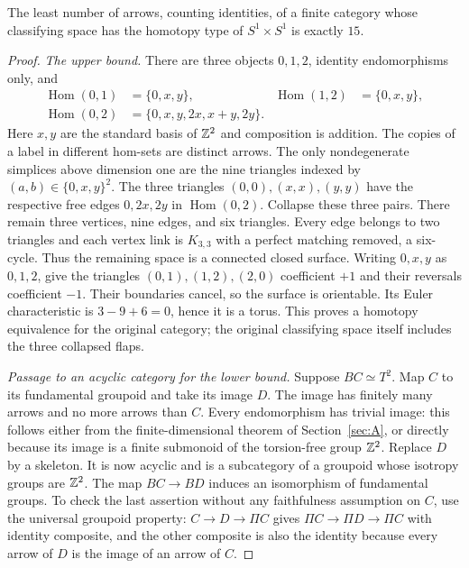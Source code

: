 \begin{theorem}\label{thm:C-torus15}
The least number of arrows, counting identities, of a finite category
whose classifying space has the homotopy type of $S^1\times S^1$
is exactly $15$.
\end{theorem}
\begin{proof}
\emph{The upper bound.}
There are three objects $0,1,2$, identity endomorphisms only, and
\[
\begin{aligned}
 \operatorname{Hom}(0,1)&=\{0,x,y\},&
 \operatorname{Hom}(1,2)&=\{0,x,y\},\\
 \operatorname{Hom}(0,2)&=\{0,x,y,2x,x+y,2y\}.&&
\end{aligned}
\]
Here $x,y$ are the standard basis of $\mathbb Z^2$ and composition is addition.
The copies of a label in different hom-sets are distinct arrows.
The only nondegenerate simplices above dimension one are the nine
triangles indexed by $(a,b)\in\{0,x,y\}^2$.
The three triangles $(0,0),(x,x),(y,y)$ have the respective free edges
$0,2x,2y$ in $\operatorname{Hom}(0,2)$. Collapse these three pairs.
There remain three vertices, nine edges, and six triangles.
Every edge belongs to two triangles and each vertex link is
$K_{3,3}$ with a perfect matching removed, a six-cycle.
Thus the remaining space is a connected closed surface.
Writing $0,x,y$ as $0,1,2$, give the triangles $(0,1),(1,2),(2,0)$
coefficient $+1$ and their reversals coefficient $-1$.
Their boundaries cancel, so the surface is orientable. Its Euler
characteristic is $3-9+6=0$, hence it is a torus.
This proves a homotopy equivalence for the original category; the
original classifying space itself includes the three collapsed flaps.

\emph{Passage to an acyclic category for the lower bound.}
Suppose $BC\simeq T^2$. Map $C$ to its fundamental groupoid and
take its image $D$. The image has finitely many arrows and no more
arrows than $C$. Every endomorphism has trivial image: this follows
either from the finite-dimensional theorem of Section~\ref{sec:A},
or directly because its image is a finite submonoid of the
torsion-free group $\mathbb Z^2$. Replace $D$ by a skeleton.
It is now acyclic and is a subcategory of a groupoid whose isotropy
groups are $\mathbb Z^2$. The map $BC\to BD$ induces an isomorphism
of fundamental groups. To check the last assertion without any
faithfulness assumption on $C$, use the universal groupoid property:
$C\to D\to\Pi C$ gives $\Pi C\to\Pi D\to\Pi C$ with
identity composite, and the other composite is also the identity
because every arrow of $D$ is the image of an arrow of $C$.


\end{proof}
